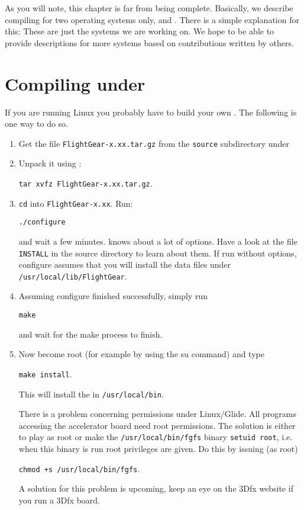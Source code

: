 As you will note, this chapter is far from being complete. Basically, we describe
compiling for two operating systems only,  and . There
is a simple explanation for this: These are just the systems we are working on. We hope
to be able to provide descriptions for more systems based on contributions written by
others.

\section{Compiling under }

If you are running Linux you probably have to build your own
. The following is one way to do so.

\begin{enumerate}

\item Get the file \texttt{FlightGear-x.xx.tar.gz} from the
\texttt{source} subdirectory under


 \noindent

\item Unpack it using :

        \texttt{tar xvfz FlightGear-x.xx.tar.gz}.

\item \texttt{cd} into \texttt{FlightGear-x.xx}. Run:

        \texttt{./configure}

 \noindent
and wait a few minutes.  knows about a lot of
options. Have a look at the file \texttt{INSTALL} in the
\FlightGear source directory to learn about them. If run without
options, configure assumes that you will install the data files
under \texttt{/usr/local/lib/FlightGear}.


\item Assuming configure finished successfully, simply run

        \texttt{make}

 \noindent
and wait for the make process to finish.


\item Now become root (for example by using the su command) and
type

        \texttt{make install}.

 \noindent
This will install the  in \texttt{/usr/local/bin}.

There is a problem concerning permissions under Linux/Glide. All
programs accessing the accelerator board need root permissions.
The solution is either to play as root or make the
\texttt{/usr/local/bin/fgfs} binary \texttt{setuid root}, i.e.
when this binary is run root privileges are given. Do this by
issuing (as root)

   \texttt{chmod +s /usr/local/bin/fgfs}.

 \noindent
A solution for this problem is upcoming, keep an eye on the 3Dfx
website if you run a 3Dfx board.

\end{enumerate}

